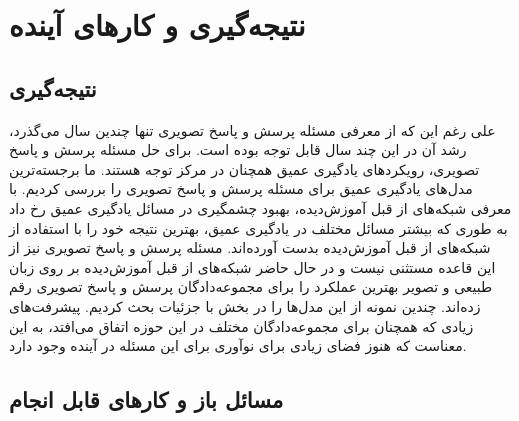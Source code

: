 \chapter{نتیجه‌گیری و کار‌های آینده}
\thispagestyle{empty}

\section{نتیجه‌گیری}
	 علی رغم این که از معرفی مسئله پرسش و پاسخ تصویری تنها چندین سال می‌گذرد، رشد آن در این چند سال قابل توجه‌ بوده است. برای حل مسئله پرسش و پاسخ تصویری، رویکرد‌های یادگیری عمیق همچنان در مرکز توجه هستند. ما برجسته‌ترین مدل‌های یادگیری عمیق برای مسئله پرسش و پاسخ تصویری را بررسی کردیم. با معرفی شبکه‌های از قبل آموزش‌دیده، بهبود چشمگیری در مسائل یادگیری عمیق رخ داد به طوری که بیشتر مسائل مختلف در یادگیری عمیق، بهترین نتیجه خود را با استفاده از شبکه‌های از قبل آموزش‌دیده بدست آورده‌اند. مسئله پرسش و پاسخ تصویری نیز از این قاعده مستثنی نیست و در حال حاضر شبکه‌های از قبل آموزش‌دیده بر روی زبان طبیعی و تصویر بهترین عملکرد را برای مجموعه‌دادگان پرسش و پاسخ تصویری رقم زده‌اند. چندین نمونه از این مدل‌ها را در بخش با جزئیات بحث کردیم. پیشرفت‌های زیادی که همچنان برای مجموعه‌دادگان مختلف در این حوزه اتفاق می‌افتد، به این معناست که هنوز فضای زیادی برای نوآوری برای این مسئله در آینده وجود دارد.
\section{مسائل باز و کارهای قابل انجام}
